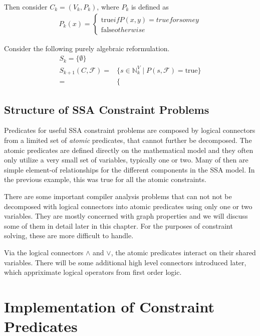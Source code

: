     Then consider $C_k=(V_k,P_k)$, where $P_k$ is defined as
    \begin{align*}
        P_k(x)=\left\{\begin{array}{l}\text{true} if P(x,y)=true for some y\\
                                      \text{false} otherwise\end{array}\right.
    \end{align*}

    Consider the following purely algebraic reformulation.
    \begin{align*}
        S_k=\{\emptyset\}\\
        S_{k+1}(C,\mathcal F)=&\{s\in\mathbb N^V_k\mid P(s,\mathcal F)=\text{true}\}\\
                             =&\{
    \end{align*}

\subsection{Structure of SSA Constraint Problems}

    Predicates for useful SSA constraint problems are composed by logical
    connectors from a limited set of {\em atomic} predicates, that cannot
    further be decomposed.
    The atomic predicates are defined directly on the mathematical model and
    they often only utilize a very small set of variables, typically one or two.
    Many of then are simple element-of relationships for the different
    components in the SSA model.
    In the previous example, this was true for all the atomic constraints.

    There are some important compiler analysis problems that can not not be
    decomposed with logical connectors into atomic predicates using only one
    or two variables.
    They are mostly concerned with graph properties and we will discuss some of
    them in detail later in this chapter.
    For the purposes of constraint solving, these are more difficult to handle.

    Via the logical connectors $\land$ and $\lor$, the atomic predicates
    interact on their shared variables.
    There will be some additional high level connectors introduced later, which
    appriximate logical operators from first order logic.

\section{Implementation of Constraint Predicates}

